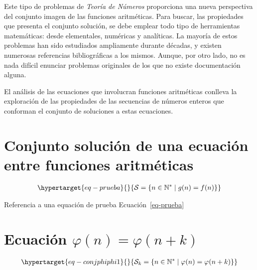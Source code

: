 \documentclass[
  letterpaper,
  DIV=11,
  numbers=noendperiod]{scrreprt}
\begin{document}
Este tipo de problemas de \emph{Teoría de Números} proporciona una nueva
perspectiva del conjunto imagen de las funciones aritméticas. Para
buscar, las propiedades que presenta el conjunto solución, se debe
emplear todo tipo de herramientas matemáticas: desde elementales,
numéricas y analíticas. La mayoría de estos problemas han sido
estudiados ampliamente durante décadas, y existen numerosas referencias
bibliográficas a los mismos. Aunque, por otro lado, no es nada difícil
enunciar problemas originales de los que no existe documentación alguna.

El análisis de las ecuaciones que involucran funciones aritméticas
conlleva la exploración de las propiedades de las secuencias de números
enteros que conforman el conjunto de soluciones a estas ecuaciones.

\hypertarget{conjunto-soluciuxf3n-de-una-ecuaciuxf3n-entre-funciones-aritmuxe9ticas}{%
\section{Conjunto solución de una ecuación entre funciones
aritméticas}\label{conjunto-soluciuxf3n-de-una-ecuaciuxf3n-entre-funciones-aritmuxe9ticas}}

\hypertarget{conjsoleq}{}

\begin{equation}\protect\hypertarget{eq-prueba}{}{
\begin{multline} 
\mathcal{S} = \{n \in \mathbb{N^*} \mid g(n)=f(n)\}
\end{multline}
}\label{eq-prueba}\end{equation}

Referencia a una equación de prueba Ecuación~\ref{eq-prueba}

\hypertarget{ecuaciuxf3n-varphin-varphin-k}{%
\section{\texorpdfstring{Ecuación
\(\varphi(n) = \varphi(n + k)\)}{Ecuación \textbackslash varphi(n) = \textbackslash varphi(n + k)}}\label{ecuaciuxf3n-varphin-varphin-k}}

\begin{equation}\protect\hypertarget{eq-conjphiphi1}{}{
\begin{multline} 
\mathcal{S}_{k} = \{n \in \mathbb{N^*} \mid \varphi(n)=\varphi(n+k)\}
\end{multline}
}\label{eq-conjphiphi1}\end{equation}
\end{document}
